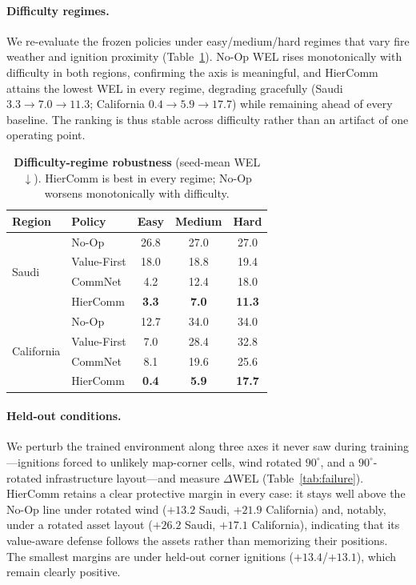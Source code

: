 \documentclass[letterpaper]{article}
\begin{document}
\paragraph{Difficulty regimes.}
We re-evaluate the frozen policies under easy/medium/hard regimes that vary fire weather and ignition proximity (Table~\ref{tab:robustness}). No-Op WEL rises monotonically with difficulty in both regions, confirming the axis is meaningful, and HierComm attains the lowest WEL in every regime, degrading gracefully (Saudi $3.3\!\to\!7.0\!\to\!11.3$; California $0.4\!\to\!5.9\!\to\!17.7$) while remaining ahead of every baseline. The ranking is thus stable across difficulty rather than an artifact of one operating point.

\begin{table}[t]
\centering
\caption{\textbf{Difficulty-regime robustness} (seed-mean WEL $\downarrow$). HierComm is best in every regime; No-Op worsens monotonically with difficulty.}
\label{tab:robustness}
\vspace{0.5em}
\begin{tabular}{llccc}
\toprule
Region & Policy & Easy & Medium & Hard \\
\midrule
\multirow{4}{*}{Saudi}
 & No-Op & 26.8 & 27.0 & 27.0 \\
 & Value-First & 18.0 & 18.8 & 19.4 \\
 & CommNet & 4.2 & 12.4 & 18.0 \\
 & HierComm & \textbf{3.3} & \textbf{7.0} & \textbf{11.3} \\
\midrule
\multirow{4}{*}{California}
 & No-Op & 12.7 & 34.0 & 34.0 \\
 & Value-First & 7.0 & 28.4 & 32.8 \\
 & CommNet & 8.1 & 19.6 & 25.6 \\
 & HierComm & \textbf{0.4} & \textbf{5.9} & \textbf{17.7} \\
\bottomrule
\end{tabular}
\end{table}

\paragraph{Held-out conditions.}
We perturb the trained environment along three axes it never saw during training---ignitions forced to unlikely map-corner cells, wind rotated $90^\circ$, and a $90^\circ$-rotated infrastructure layout---and measure $\Delta$WEL (Table~\ref{tab:failure}). HierComm retains a clear protective margin in every case: it stays well above the No-Op line under rotated wind ($+13.2$ Saudi, $+21.9$ California) and, notably, under a rotated asset layout ($+26.2$ Saudi, $+17.1$ California), indicating that its value-aware defense follows the assets rather than memorizing their positions. The smallest margins are under held-out corner ignitions ($+13.4$/$+13.1$), which remain clearly positive.
\end{document}
